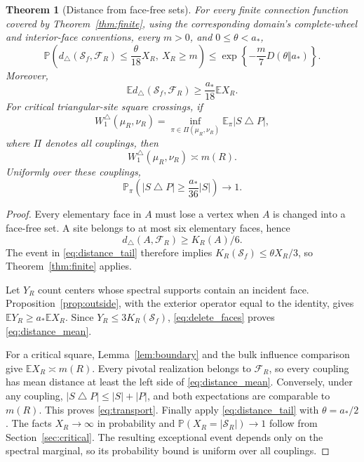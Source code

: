 \documentclass[11pt]{amsart}
\newtheorem{theorem}{Theorem}[section]
\theoremstyle{remark}
\newcommand{\Prob}{\mathbb P}
\newcommand{\E}{\mathbb E}
\newcommand{\cS}{\mathcal S}
\newcommand{\astar}{a_*}
\begin{document}
\begin{theorem}[Distance from face-free sets]\label{thm:distance}
For every finite connection function covered by Theorem~\ref{thm:finite}, using the corresponding domain's complete-wheel and interior-face conventions, every $m>0$, and $0\le\theta<\astar$,
\begin{equation}\label{eq:distance_tail}
 \Prob\left(d_\triangle(\cS_f,\mathcal F_R)\le\frac{\theta}{18}X_R,\ X_R\ge m\right)
 \le\exp\left\{-\frac m7D(\theta\Vert\astar)\right\}.
\end{equation}
Moreover,
\begin{equation}\label{eq:distance_mean}
 \E d_\triangle(\cS_f,\mathcal F_R)\ge\frac{\astar}{18}\E X_R.
\end{equation}
For critical triangular-site square crossings, if
\[
 W_1^\triangle(\mu_R,\nu_R)
 =\inf_{\pi\in\Pi(\mu_R,\nu_R)}\E_\pi|S\mathbin\triangle P|,
\]
where $\Pi$ denotes all couplings, then
\begin{equation}\label{eq:transport}
 W_1^\triangle(\mu_R,\nu_R)\asymp m(R).
\end{equation}
Uniformly over these couplings,
\begin{equation}\label{eq:coupling_distance}
 \Prob_\pi\left(|S\mathbin\triangle P|\ge\frac{\astar}{36}|S|\right)\longrightarrow1.
\end{equation}
\end{theorem}
\begin{proof}
Every elementary face in $A$ must lose a vertex when $A$ is changed into a face-free set. A site belongs to at most six elementary faces, hence
\begin{equation}\label{eq:delete_faces}
 d_\triangle(A,\mathcal F_R)\ge K_R(A)/6.
\end{equation}
The event in \eqref{eq:distance_tail} therefore implies $K_R(\cS_f)\le\theta X_R/3$, so Theorem~\ref{thm:finite} applies.

Let $Y_R$ count centers whose spectral supports contain an incident face. Proposition~\ref{prop:outside}, with the exterior operator equal to the identity, gives $\E Y_R\ge\astar\E X_R$. Since $Y_R\le3K_R(\cS_f)$, \eqref{eq:delete_faces} proves \eqref{eq:distance_mean}.

For a critical square, Lemma~\ref{lem:boundary} and the bulk influence comparison give $\E X_R\asymp m(R)$. Every pivotal realization belongs to $\mathcal F_R$, so every coupling has mean distance at least the left side of \eqref{eq:distance_mean}. Conversely, under any coupling, $|S\mathbin\triangle P|\le|S|+|P|$, and both expectations are comparable to $m(R)$. This proves \eqref{eq:transport}. Finally apply \eqref{eq:distance_tail} with $\theta=\astar/2$. The facts $X_R\to\infty$ in probability and $\Prob(X_R=|\cS_R|)\to1$ follow from Section~\ref{sec:critical}. The resulting exceptional event depends only on the spectral marginal, so its probability bound is uniform over all couplings.
\end{proof}
\end{document}
